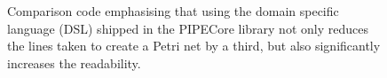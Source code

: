 \begin{figure}[tb]
\caption{Comparison code emphasising that using the domain specific language (DSL) shipped in the PIPECore library not only reduces the lines taken to create a Petri net by a third, but also significantly increases the readability.}
\label{lst:dsl}
\end{figure}